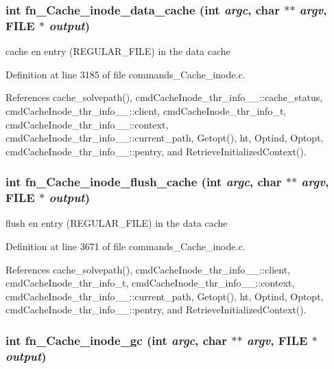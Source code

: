 \subsubsection{\setlength{\rightskip}{0pt plus 5cm}int fn\_\-Cache\_\-inode\_\-data\_\-cache (int {\em argc}, char $\ast$$\ast$ {\em argv}, FILE $\ast$ {\em output})}\label{commands_8h_a50}


cache en entry (REGULAR\_\-FILE) in the data cache 

Definition at line 3185 of file commands\_\-Cache\_\-inode.c.

References cache\_\-solvepath(), cmd\-Cache\-Inode\_\-thr\_\-info\_\-\_\-::cache\_\-status, cmd\-Cache\-Inode\_\-thr\_\-info\_\-\_\-::client, cmd\-Cache\-Inode\_\-thr\_\-info\_\-t, cmd\-Cache\-Inode\_\-thr\_\-info\_\-\_\-::context, cmd\-Cache\-Inode\_\-thr\_\-info\_\-\_\-::current\_\-path, Getopt(), ht, Optind, Optopt, cmd\-Cache\-Inode\_\-thr\_\-info\_\-\_\-::pentry, and Retrieve\-Initialized\-Context().
\subsubsection{\setlength{\rightskip}{0pt plus 5cm}int fn\_\-Cache\_\-inode\_\-flush\_\-cache (int {\em argc}, char $\ast$$\ast$ {\em argv}, FILE $\ast$ {\em output})}\label{commands_8h_a53}


flush en entry (REGULAR\_\-FILE) in the data cache 

Definition at line 3671 of file commands\_\-Cache\_\-inode.c.

References cache\_\-solvepath(), cmd\-Cache\-Inode\_\-thr\_\-info\_\-\_\-::client, cmd\-Cache\-Inode\_\-thr\_\-info\_\-t, cmd\-Cache\-Inode\_\-thr\_\-info\_\-\_\-::context, cmd\-Cache\-Inode\_\-thr\_\-info\_\-\_\-::current\_\-path, Getopt(), ht, Optind, Optopt, cmd\-Cache\-Inode\_\-thr\_\-info\_\-\_\-::pentry, and Retrieve\-Initialized\-Context().
\subsubsection{\setlength{\rightskip}{0pt plus 5cm}int fn\_\-Cache\_\-inode\_\-gc (int {\em argc}, char $\ast$$\ast$ {\em argv}, FILE $\ast$ {\em output})}\label{commands_8h_a40}


